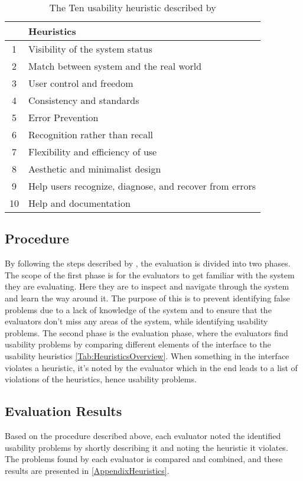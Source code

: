 \begin{table}
\centering
\begin{tabular}[width=\textwidth]{cl}
\hline
& \textbf{Heuristics \parencite{WEB:Nielsen1994Ten} }\\ \hline
1 & Visibility of the system status \\ 
2 & Match between system and the real world \\ 
3 & User control and freedom \\ 
4 & Consistency and standards \\ 
5 & Error Prevention \\ 
6 & Recognition rather than recall \\ 
7 & Flexibility and efficiency of use \\ 
8 & Aesthetic and minimalist design \\ 
9 & Help users recognize, diagnose, and recover from errors \\ 
10 & Help and documentation \\ \hline
\end{tabular}
\caption{The Ten usability heuristic described by \textcite{WEB:Nielsen1994Ten}}
\label{Tab:HeuristicsOverview}
\end{table}

\subsection{Procedure}
\label{HeuristicProcedure}
By following the steps described by \textcite{WEB:Nielsen1994HowTo}, the evaluation is divided into two phases. The scope of the first phase is for the evaluators to get familiar with the system they are evaluating. Here they are to inspect and navigate through the system and learn the way around it. The purpose of this is to prevent identifying false problems due to a lack of knowledge of the system and to ensure that the evaluators don't miss any areas of the system, while identifying usability problems. The second phase is the evaluation phase, where the evaluators find usability problems by comparing different elements of the interface to the usability heuristics \autoref{Tab:HeuristicsOverview}. When something in the interface violates a heuristic, it's noted by the evaluator which in the end leads to a list of violations of the heuristics, hence usability problems. 

\subsection{Evaluation Results}
\label{Heuristic_Results}
Based on the procedure described above, each evaluator noted the identified usability problems by shortly describing it and noting the heuristic it violates. The problems found by each evaluator is compared and combined, and these results are presented in \autoref{AppendixHeuristics}. 

